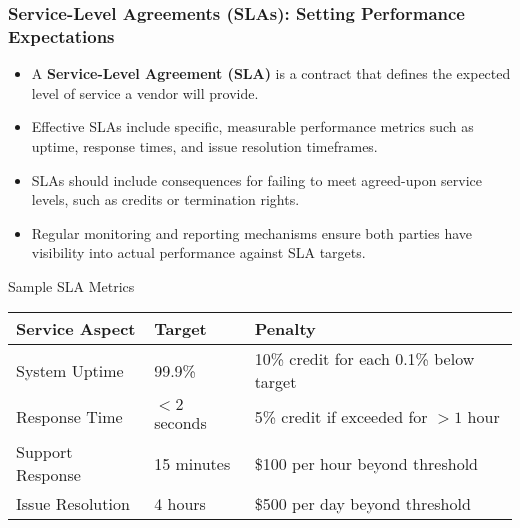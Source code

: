 \documentclass{beamer}
\begin{document}
\begin{frame}
    \frametitle{Service-Level Agreements (SLAs): Setting Performance Expectations}
    
    \begin{itemize}
        \item A \textbf{Service-Level Agreement (SLA)} is a contract that defines the expected level of service a vendor will provide.
        \item Effective SLAs include specific, measurable performance metrics such as uptime, response times, and issue resolution timeframes.
        \item SLAs should include consequences for failing to meet agreed-upon service levels, such as credits or termination rights.
        \item Regular monitoring and reporting mechanisms ensure both parties have visibility into actual performance against SLA targets.
    \end{itemize}
    
    \begin{exampleblock}{Sample SLA Metrics}
        \scriptsize
        \begin{tabular}{lll}
            \textbf{Service Aspect} & \textbf{Target} & \textbf{Penalty} \\
            \hline
            System Uptime & 99.9\% & 10\% credit for each 0.1\% below target \\
            Response Time & $<2$ seconds & 5\% credit if exceeded for $>1$ hour \\
            Support Response & 15 minutes & \$100 per hour beyond threshold \\
            Issue Resolution & 4 hours & \$500 per day beyond threshold \\
        \end{tabular}
    \end{exampleblock}
\end{frame}
\end{document}
